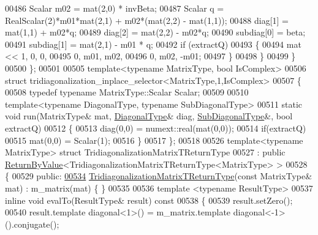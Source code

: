 \begin{DoxyCode}
00486       Scalar m02 = mat(2,0) * invBeta;
00487       Scalar q = RealScalar(2)*m01*mat(2,1) + m02*(mat(2,2) - mat(1,1));
00488       diag[1] = mat(1,1) + m02*q;
00489       diag[2] = mat(2,2) - m02*q;
00490       subdiag[0] = beta;
00491       subdiag[1] = mat(2,1) - m01 * q;
00492       \textcolor{keywordflow}{if} (extractQ)
00493       \{
00494         mat << 1,   0,    0,
00495                0, m01,  m02,
00496                0, m02, -m01;
00497       \}
00498     \}
00499   \}
00500 \};
00501 
00505 \textcolor{keyword}{template}<\textcolor{keyword}{typename} MatrixType, \textcolor{keywordtype}{bool} IsComplex>
00506 \textcolor{keyword}{struct }tridiagonalization\_inplace\_selector<MatrixType,1,IsComplex>
00507 \{
00508   \textcolor{keyword}{typedef} \textcolor{keyword}{typename} MatrixType::Scalar Scalar;
00509 
00510   \textcolor{keyword}{template}<\textcolor{keyword}{typename} DiagonalType, \textcolor{keyword}{typename} SubDiagonalType>
00511   \textcolor{keyword}{static} \textcolor{keywordtype}{void} run(MatrixType& mat, \hyperlink{class_eigen_1_1internal_1_1_tensor_lazy_evaluator_writable}{DiagonalType}& diag, 
      \hyperlink{group___core___module_class_eigen_1_1_matrix}{SubDiagonalType}&, \textcolor{keywordtype}{bool} extractQ)
00512   \{
00513     diag(0,0) = numext::real(mat(0,0));
00514     \textcolor{keywordflow}{if}(extractQ)
00515       mat(0,0) = Scalar(1);
00516   \}
00517 \};
00518 
00526 \textcolor{keyword}{template}<\textcolor{keyword}{typename} MatrixType> \textcolor{keyword}{struct }TridiagonalizationMatrixTReturnType
00527 : \textcolor{keyword}{public} \hyperlink{group___core___module_class_eigen_1_1_return_by_value}{ReturnByValue}<TridiagonalizationMatrixTReturnType<MatrixType> >
00528 \{
00529   \textcolor{keyword}{public}:
\hyperlink{struct_eigen_1_1internal_1_1_tridiagonalization_matrix_t_return_type_ac49f3c4df8b40dfa002c6e04e3d1b97f}{00534}     \hyperlink{struct_eigen_1_1internal_1_1_tridiagonalization_matrix_t_return_type_ac49f3c4df8b40dfa002c6e04e3d1b97f}{TridiagonalizationMatrixTReturnType}(\textcolor{keyword}{const} MatrixType& mat) : 
      m\_matrix(mat) \{ \}
00535 
00536     \textcolor{keyword}{template} <\textcolor{keyword}{typename} ResultType>
00537     \textcolor{keyword}{inline} \textcolor{keywordtype}{void} evalTo(ResultType& result)\textcolor{keyword}{ const}
00538 \textcolor{keyword}{    }\{
00539       result.setZero();
00540       result.template diagonal<1>() = m\_matrix.template diagonal<-1>().conjugate();

\end{DoxyCode}
